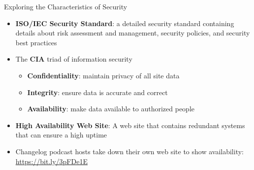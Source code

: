 \documentclass[14pt,aspectratio=169]{beamer}
\begin{document}
%
\begin{frame}{Exploring the Characteristics of Security}
  \begin{itemize}
    \item {\bf ISO/IEC Security Standard}: a detailed security standard
      containing details about risk assessment and management, security
      policies, and security best practices
      \vspace*{-.15in}
    \item The {\bf CIA} triad of information security
      \begin{itemize}
        \item {\bf Confidentiality}: maintain privacy of all site data
        \item {\bf Integrity}: ensure data is accurate and correct
        \item {\bf Availability}: make data available to authorized people
      \end{itemize}
      \vspace*{-.25in}
    \item {\bf High Availability Web Site}: A web site that contains redundant
      systems that can ensure a high uptime
      \vspace*{-.25in}
    \item Changelog podcast hosts take down their own web site to show
      availability: \url{https://bit.ly/3pFDe1E}
  \end{itemize}
\end{frame}
\end{document}

